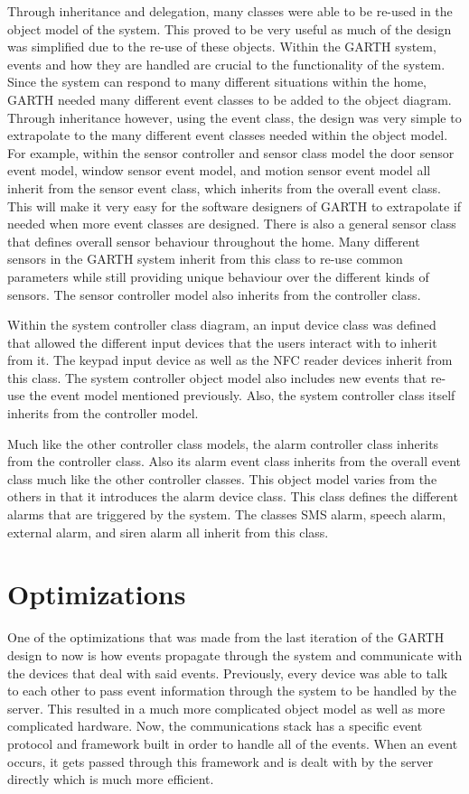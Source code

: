 \documentclass{report}
\begin{document}
Through inheritance and delegation, many classes were able to be re-used in the
object model of the system. This proved to be very useful as much of the design
was simplified due to the re-use of these objects. Within the GARTH system,
events and how they are handled are crucial to the functionality of the system.
Since the system can respond to many different situations within the home,
GARTH needed many different event classes to be added to the object diagram.
Through inheritance however, using the event class, the design was very simple
to extrapolate to the many different event classes needed within the object
model. For example, within the sensor controller and sensor class model the
door sensor event model, window sensor event model, and motion sensor event
model all inherit from the sensor event class, which inherits from the overall
event class. This will make it very easy for the software designers of GARTH to
extrapolate if needed when more event classes are designed. There is also a
general sensor class that defines overall sensor behaviour throughout the home.
Many different sensors in the GARTH system inherit from this class to re-use
common parameters while still providing unique behaviour over the different
kinds of sensors. The sensor controller model also inherits from the controller
class.

Within the system controller class diagram, an input device class was defined
that allowed the different input devices that the users interact with to
inherit from it. The keypad input device as well as the NFC reader devices
inherit from this class. The system controller object model also includes new
events that re-use the event model mentioned previously. Also, the system
controller class itself inherits from the controller model.

Much like the other controller class models, the alarm controller class
inherits from the controller class. Also its alarm event class inherits from
the overall event class much like the other controller classes. This object
model varies from the others in that it introduces the alarm device class. This
class defines the different alarms that are triggered by the system. The
classes SMS alarm, speech alarm, external alarm, and siren alarm all inherit
from this class.

\section{Optimizations}

One of the optimizations that was made from the last iteration of the GARTH
design to now is how events propagate through the system and communicate with
the devices that deal with said events. Previously, every device was able to
talk to each other to pass event information through the system to be handled by
the server. This resulted in a much more complicated object model as well as
more complicated hardware. Now, the communications stack has a specific event
protocol and framework built in order to handle all of the events. When an 
event occurs, it gets passed through this framework and is dealt with by the
server directly which is much more efficient.
\end{document}

